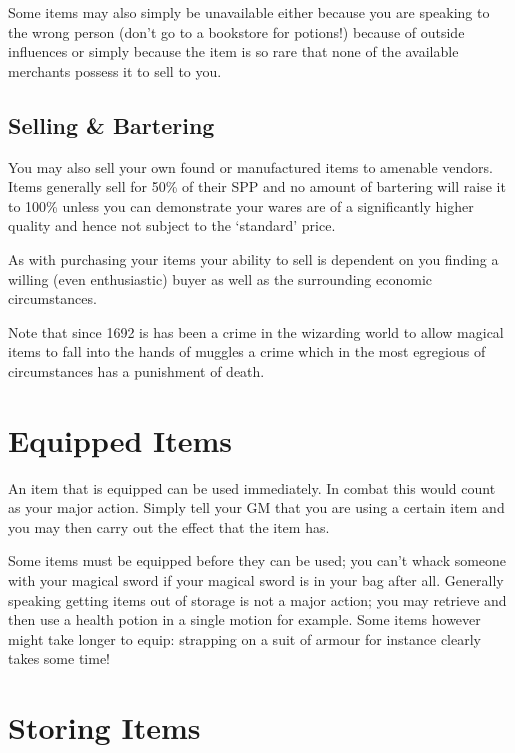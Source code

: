 Some items may also simply be unavailable \minus{} either because you are speaking to the wrong person (don't go to a bookstore for potions!)\comma{} because of outside influences\comma{} or simply because the item is so rare that none of the available merchants possess it to sell to you. 

\subsection{Selling \& Bartering}

You may also sell your own found or manufactured items to amenable vendors. Items generally sell for 50\% of their SPP\comma{} and no amount of bartering will raise it to 100\%\comma{} unless you can demonstrate your wares are of a significantly higher quality\comma{} and hence not subject to the `standard' price. 

As with purchasing your items\comma{} your ability to sell is dependent on you finding a willing (even enthusiastic) buyer\comma{} as well as the surrounding economic circumstances. 

Note that since 1692 is has been a crime in the wizarding world to allow magical items to fall into the hands of muggles \minus{} a crime which\comma{} in the most egregious of circumstances\comma{} has a punishment of death. 


\section{Equipped Items}

An item that is equipped can be used immediately. In combat\comma{} this would count as your major action. Simply tell your GM that you are using a certain item\comma{} and you may then carry out the effect that the item has. 

Some items must be equipped before they can be used; you can't whack someone with your magical sword\comma{} if your magical sword is in your bag\comma{} after all. Generally speaking\comma{} getting items out of storage is not a major action; you may retrieve and then use a health potion in a single motion\comma{} for example. Some items\comma{} however\comma{} might take longer to equip: strapping on a suit of armour\comma{} for instance\comma{} clearly takes some time!



\section{Storing Items}

